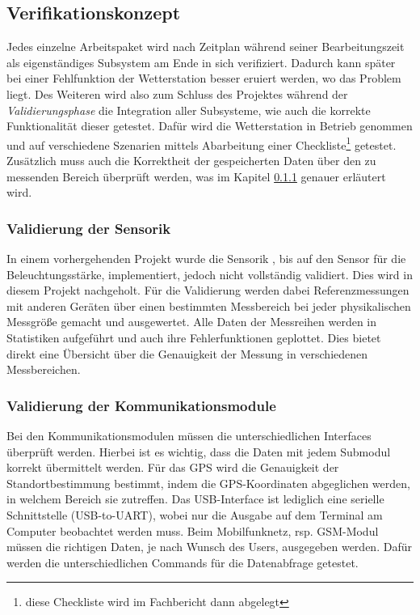 \subsection{Verifikationskonzept}
Jedes einzelne Arbeitspaket wird nach Zeitplan während seiner Bearbeitungszeit als eigenständiges Subsystem am Ende in sich verifiziert. Dadurch kann später bei einer Fehlfunktion der Wetterstation besser eruiert werden, wo das Problem liegt. Des Weiteren wird also zum Schluss des Projektes während der \textit{Validierungsphase} die Integration aller Subsysteme, wie auch die korrekte Funktionalität dieser getestet. Dafür wird die Wetterstation in Betrieb genommen und auf verschiedene Szenarien mittels Abarbeitung einer Checkliste\footnote{diese Checkliste wird im Fachbericht dann abgelegt} getestet. Zusätzlich muss auch die Korrektheit der gespeicherten Daten über den zu messenden Bereich überprüft werden, was im Kapitel \ref{subsubsec:validierungdersensorik} genauer erläutert wird.\\
\subsubsection{Validierung der Sensorik}
\label{subsubsec:validierungdersensorik}
In einem vorhergehenden Projekt wurde die Sensorik , bis auf den Sensor für die Beleuchtungsstärke, implementiert, jedoch nicht vollständig validiert. Dies wird in diesem Projekt nachgeholt. Für die Validierung werden dabei Referenzmessungen mit anderen Geräten über einen bestimmten Messbereich bei jeder physikalischen Messgröße gemacht und ausgewertet. Alle Daten der Messreihen werden in Statistiken aufgeführt und auch ihre Fehlerfunktionen geplottet. Dies bietet direkt eine Übersicht über die Genauigkeit der Messung in verschiedenen Messbereichen.\\

\subsubsection{Validierung der Kommunikationsmodule}
Bei den Kommunikationsmodulen müssen die unterschiedlichen Interfaces überprüft werden. Hierbei ist es wichtig, dass die Daten mit jedem Submodul korrekt übermittelt werden. Für das GPS wird die Genauigkeit der Standortbestimmung bestimmt, indem die GPS-Koordinaten abgeglichen werden, in welchem Bereich sie zutreffen. Das USB-Interface ist lediglich eine serielle Schnittstelle (USB-to-UART), wobei nur die Ausgabe auf dem Terminal am Computer beobachtet werden muss. Beim Mobilfunknetz, rsp. GSM-Modul müssen die richtigen Daten, je nach Wunsch des Users, ausgegeben werden. Dafür werden die unterschiedlichen Commands für die Datenabfrage getestet.\\
